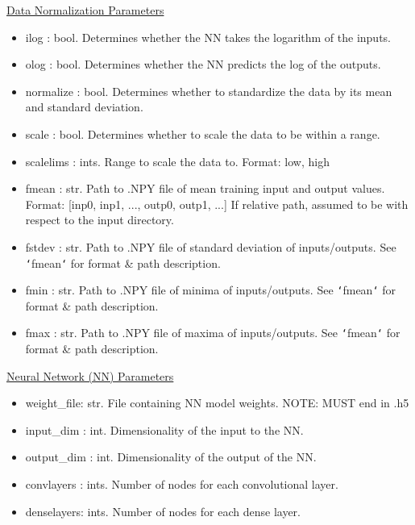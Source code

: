 \documentclass[letterpaper, 12pt]{article}
\begin{document}
\noindent \underline{Data Normalization Parameters}
\begin{itemize}
\item ilog        : bool. Determines whether the NN takes the logarithm of the 
                          inputs.
\item olog        : bool. Determines whether the NN predicts the log of the 
                          outputs.
\item normalize   : bool. Determines whether to standardize the data by its 
                          mean and standard deviation.
\item scale       : bool. Determines whether to scale the data to be within a 
                          range.
\item scalelims   : ints. Range to scale the data to.
                          Format: low, high
\item fmean       : str.  Path to .NPY file of mean training input and output 
                          values.
                          Format: [inp0, inp1, ..., outp0, outp1, ...]
                          If relative path, assumed to be with respect to the 
                          input directory.
\item fstdev      : str.  Path to .NPY file of standard deviation of 
                          inputs/outputs.
                          See \texttt{`}fmean\texttt{`} for format \& path 
                          description.
\item fmin        : str.  Path to .NPY file of minima of inputs/outputs.
                          See \texttt{`}fmean\texttt{`} for format \& path 
                          description.
\item fmax        : str.  Path to .NPY file of maxima of inputs/outputs.
                          See \texttt{`}fmean\texttt{`} for format \& path 
                          description.
\end{itemize}


\noindent \underline{Neural Network (NN) Parameters}
\begin{itemize}
\item weight\_file: str.  File containing NN model weights.
                   NOTE: MUST end in .h5
\item input\_dim  : int.  Dimensionality of the input  to the NN.
\item output\_dim : int.  Dimensionality of the output of the NN.
\item convlayers : ints. Number of nodes for each convolutional layer.
\item denselayers: ints. Number of nodes for each dense         layer.
\end{itemize}
\end{document}
